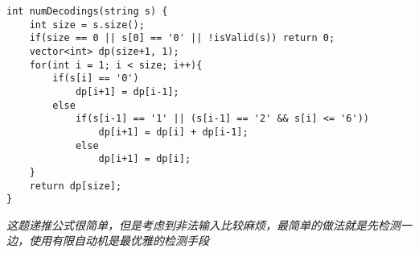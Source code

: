 \begin{description}
\begin{lstlisting}
int numDecodings(string s) {
	int size = s.size();
	if(size == 0 || s[0] == '0' || !isValid(s))	return 0;
	vector<int> dp(size+1, 1);
	for(int i = 1; i < size; i++){
		if(s[i] == '0')
			dp[i+1] = dp[i-1];
		else
			if(s[i-1] == '1' || (s[i-1] == '2' && s[i] <= '6'))
				dp[i+1] = dp[i] + dp[i-1];
			else
				dp[i+1] = dp[i];
	}
	return dp[size];
}
    \end{lstlisting}
	\textit{这题递推公式很简单，但是考虑到非法输入比较麻烦，最简单的做法就是先检测一边，使用有限自动机是最优雅的检测手段}
\end{description}

